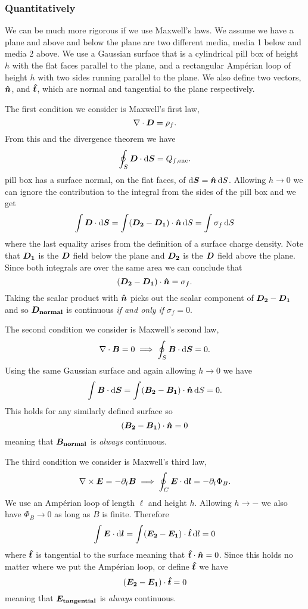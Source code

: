    \subsubsection{Quantitatively}
    We can be much more rigorous if we use Maxwell's laws.
    We assume we have a plane and above and below the plane are two different media, media 1 below and media 2 above.
    We use a Gaussian surface that is a cylindrical pill box of height \(h\) with the flat faces parallel to the plane, and a rectangular Amp\'erian loop of height \(h\) with two sides running parallel to the plane.
    We also define two vectors, \(\bm{\hat{n}}\), and \(\bm{\hat{t}}\), which are normal and tangential to the plane respectively.
    
    The first condition we consider is Maxwell's first law,
    \[\nabla\cdot\bm{D} = \rho_f.\]
    From this and the divergence theorem we have
    \[\oint_S\bm{D}\cdot\dd{\bm{S}} = Q_{f, {\mathrm{enc}}}.\]
    pill box has a surface normal, on the flat faces, of \(\dd{\bm{S}} = \bm{\hat{n}}\dd{S}\).
    Allowing \(h\to 0\) we can ignore the contribution to the integral from the sides of the pill box and we get
    \[\int\bm{D}\cdot\dd{\bm{S}} = \int(\bm{D_2} - \bm{D_1})\cdot\bm{\hat{n}}\dd{S} = \int \sigma_f \dd{S}\]
    where the last equality arises from the definition of a surface charge density.
    Note that \(\bm{D_1}\) is the \(\bm{D}\) field below the plane and \(\bm{D_2}\) is the \(\bm{D}\) field above the plane.
    Since both integrals are over the same area we can conclude that
    \[(\bm{D_2} - \bm{D_1})\cdot\bm{\hat{n}} = \sigma_f.\]
    Taking the scalar product with \(\bm{\hat{n}}\) picks out the scalar component of \(\bm{D_2} - \bm{D_1}\) and so \(\bm{D_{\mathrm{normal}}}\) is continuous \emph{if and only if} \(\sigma_f = 0\).
    
    The second condition we consider is Maxwell's second law,
    \[\nabla\cdot\bm{B} = 0 \implies \oint_S \bm{B}\cdot\dd{\bm{S}} = 0.\]
    Using the same Gaussian surface and again allowing \(h\to 0\) we have
    \[\int\bm{B}\cdot\dd{\bm{S}} = \int (\bm{B_2} - \bm{B_1})\cdot\bm{\hat{n}}\dd{S} = 0.\]
    This holds for any similarly defined surface so
    \[(\bm{B_2} - \bm{B_1})\cdot\bm{\hat{n}} = 0\]
    meaning that \(\bm{B_{\mathrm{normal}}}\) is \emph{always} continuous.
    
    The third condition we consider is Maxwell's third law,
    \[\nabla\times\bm{E} = -\partial_t\bm{B} \implies \oint_C\bm{E}\cdot\dd{\bm{l}} = -\partial_t\Phi_B.\]
    We use an Amp\'erian loop of length \(\ell\) and height \(h\).
    Allowing \(h\to -\) we also have \(\Phi_B\to 0\) as long as \(B\) is finite.
    Therefore
    \[\int \bm{E}\cdot\dd{\bm{l}} = \int(\bm{E_2} - \bm{E_1})\cdot\bm{\hat{t}} \dd{l} = 0\]
    where \(\bm{\hat{t}}\) is tangential to the surface meaning that \(\bm{\hat{t}}\cdot\bm{\hat{n}} = 0\).
    Since this holds no matter where we put the Amp\'erian loop, or define \(\bm{\hat{t}}\) we have
    \[(\bm{E_2} - \bm{E_1})\cdot\bm{\hat{t}} = 0\]
    meaning that \(\bm{E_{\mathrm{tangential}}}\) is \emph{always} continuous.
    

